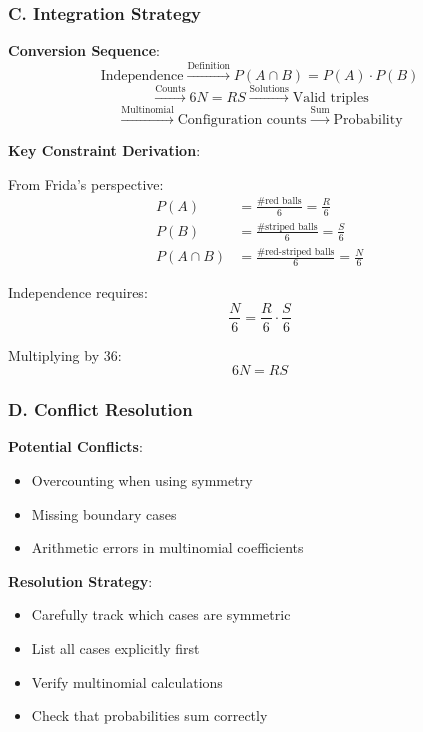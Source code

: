 \documentclass[12pt]{article}
\begin{document}
\begin{techniquesbox}
\subsubsection*{C. Integration Strategy}

\textbf{Conversion Sequence}:
$$\text{Independence} \xrightarrow{\text{Definition}} P(A \cap B) = P(A) \cdot P(B)$$
$$\xrightarrow{\text{Counts}} 6N = RS \xrightarrow{\text{Solutions}} \text{Valid triples}$$
$$\xrightarrow{\text{Multinomial}} \text{Configuration counts} \xrightarrow{\text{Sum}} \text{Probability}$$

\textbf{Key Constraint Derivation}:

From Frida's perspective:
\begin{align*}
P(A) &= \frac{\text{\# red balls}}{6} = \frac{R}{6} \\
P(B) &= \frac{\text{\# striped balls}}{6} = \frac{S}{6} \\
P(A \cap B) &= \frac{\text{\# red-striped balls}}{6} = \frac{N}{6}
\end{align*}

Independence requires:
$$\frac{N}{6} = \frac{R}{6} \cdot \frac{S}{6}$$

Multiplying by 36:
$$\boxed{6N = RS}$$

\subsubsection*{D. Conflict Resolution}

\textbf{Potential Conflicts}:
\begin{itemize}
    \item Overcounting when using symmetry
    \item Missing boundary cases
    \item Arithmetic errors in multinomial coefficients
\end{itemize}

\textbf{Resolution Strategy}:
\begin{itemize}
    \item Carefully track which cases are symmetric
    \item List all cases explicitly first
    \item Verify multinomial calculations
    \item Check that probabilities sum correctly
\end{itemize}

\end{techniquesbox}
\end{document}
